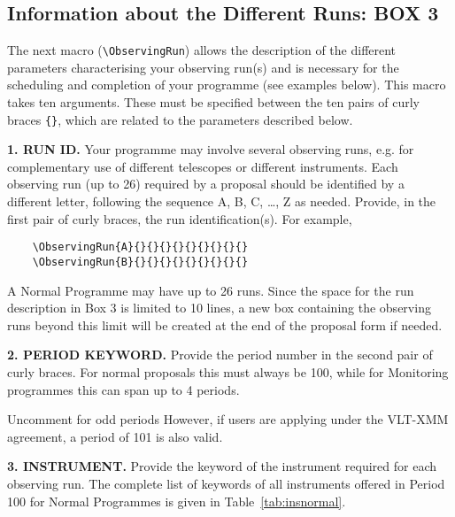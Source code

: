 \documentclass{article}
\begin{document}

\subsection{Information about the Different Runs: {\bf BOX 3}}
\label{sec:obsrun}

The next macro (\verb|\ObservingRun|) allows the description of the
different parameters characterising your observing run(s) and is
necessary for the scheduling and completion of your programme (see
examples below). This macro takes ten arguments.
These must be specified between the ten pairs of curly braces \verb|{}|, 
which are related to the parameters described below.

\medskip

{\bf 1. RUN ID.} Your programme may involve several observing
runs, e.g. for complementary use of different telescopes or
different instruments. Each observing run (up to 26) required by a
proposal should be identified by a different letter, following the
sequence A, B, C, \dots, Z as needed.  Provide, in the first pair of
curly braces, the run identification(s).  For example,
\begin{verbatim}
    \ObservingRun{A}{}{}{}{}{}{}{}{}{}
    \ObservingRun{B}{}{}{}{}{}{}{}{}{}
\end{verbatim}
A Normal Programme may have up to 26 runs. Since the space for the
run description in Box 3 is limited to 10 lines, a new box containing
the observing runs beyond this limit will be created at the end of the
proposal form if needed. 

\medskip

{\bf 2. PERIOD KEYWORD.} Provide the period number in the second pair
of curly braces.  For normal proposals this must always be 100,
while for  Monitoring programmes this can span up to 4 periods.

\ifodd\period
 Uncomment for odd periods
 However, if users are applying under the VLT-XMM agreement,
 a period of 101 is also valid.
\fi

\medskip

{\bf 3. INSTRUMENT.} Provide the keyword of the instrument required
for each observing run. The complete list of keywords of all
instruments offered in Period 100 for Normal Programmes is
given in Table~\ref{tab:insnormal}. 
\end{document}
